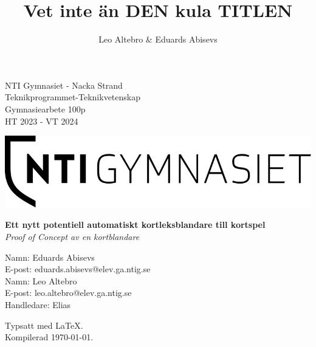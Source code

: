 \documentclass[swedish,a4paper]{article}
\title{Vet inte än DEN kula TITLEN}
\author{Leo Altebro & Eduards Abisevs}
\begin{document}
\begin{titlepage}
	\begin{minipage}[t]{0.45\textwidth}
        \raggedright
        NTI Gymnasiet - Nacka Strand \\
        Teknikprogrammet-Teknikvetenskap \\
        Gymnasiearbete 100p \\
        HT 2023 - VT 2024
    \end{minipage}
    \begin{minipage}[t]{0.5\textwidth}
        \raggedleft
	\begin{adjustbox}{valign=t}
        \includegraphics[width=\linewidth]{images/logo.jpg}
    	\end{adjustbox}
    \end{minipage}

    \vspace*{\fill} %

    \begin{center}
	\Large\textbf{Ett nytt potentiell automatiskt kortleksblandare till
	kortspel}\\
        \large\textit{Proof of Concept av en kortblandare}
    \end{center}

    \vspace*{\fill} %

    \begin{minipage}[b]{0.45\textwidth}
        \raggedright
        Namn: Eduards Abisevs\\
        E-post: eduards.abisevs@elev.ga.ntig.se\\
        Namn: Leo Altebro\\
        E-post: leo.altebro@elev.ga.ntig.se\\
        Handledare: Elias
    \end{minipage}
    \begin{minipage}[b]{0.5\textwidth}
	\raggedleft
	Typsatt med \LaTeX. \\
	Kompilerad \today.
    \end{minipage}
\end{titlepage}
\end{document}
